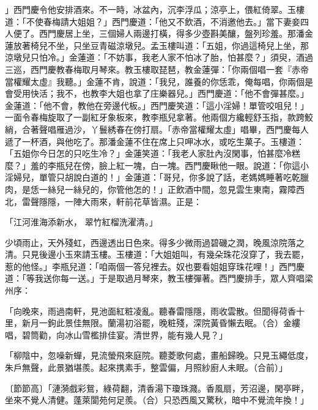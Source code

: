 \begin{showcontents}{}
」西門慶令他安排酒來。不一時，冰盆內，沉李浮瓜；涼亭上，偎紅倚翠。玉樓道：「不使春梅請大姐姐？」西門慶道：「他又不飲酒，不消邀他去。」當下妻妾四人便了。西門慶居上坐，三個婦人兩邊打橫，得多少壺斟美釀，盤列珍羞。那潘金蓮放著椅兒不坐，只坐豆青磁涼墩兒。孟玉樓叫道：「五姐，你過這椅兒上坐，那涼墩兒只怕冷。」金蓮道：「不妨事，我老人家不怕冰了胎，怕甚麼？」須臾，酒過三巡，西門慶教春梅取月琴來。教玉樓取琵琶，教金蓮彈：「你兩個唱一套『赤帝當權耀太虛』我聽。」金蓮不肯，說道：「我兒，誰養的你恁乖，俺每唱，你兩個是會受用快活；我不，也教李大姐也拿了庄樂器兒。」西門慶道：「他不會彈甚麼。」金蓮道：「他不會，教他在旁邊代板。」西門慶笑道：「這小淫婦！單管咬咀兒！」一面令春梅旋取了一副紅牙象板來，教李瓶兒拿著。他兩個方纔輕舒玉指，款跨鮫綃，合著聲唱雁過沙，丫鬟綉春在傍打扇。「赤帝當權耀太虛」唱畢，西門慶每人遞了一杯酒，與他吃了。那潘金蓮不住在席上只呷冰水，或吃生菓子。玉樓道：「五姐你今日怎的只吃生冷？」金蓮笑道：「我老人家肚內沒閑事，怕甚麼冷糕麼？」羞的李瓶兒在傍，臉上紅一塊，白一塊。西門慶瞅他一眼。說道：「你這小淫婦兒，單管只胡說白道的！」金蓮道：「哥兒，你多說了話，老媽媽睡著吃乾臘肉，是恁一絲兒一絲兒的，你管他怎的！」正飲酒中間，忽見雲生東南，霧障西北，雷聲隱隱，一陣大雨來，軒前花草皆濕。正是：

「江河淮海添新水，  翠竹紅榴洗濯清。」

少頃雨止，天外殘虹，西邊透出日色來。得多少微雨過碧磯之潤，晚風涼院落之清。只見後邊小玉來請玉樓。玉樓道：「大姐姐叫，有幾朵珠花沒穿了，我去罷，惹的他怪。」李瓶兒道：「咱兩個一答兒裡去。奴也要看姐姐穿珠花哩！」西門慶道：「等我送你每一送。」于是取過月琴來，教玉樓彈著。西門慶排手，眾人齊唱梁州序：

「向晚來，雨過南軒，見池面紅粧凌亂。聽春雷隱隱，雨收雲散。但聞得荷香十里，新月一鉤此景佳無限。蘭湯初浴罷，晚粧殘，深院黃昏懶去眠。（合）金縷唱，碧筒勸，向冰山雪檻排佳宴。清世界，能有幾人見？」

「柳陰中，忽噪新蟬，見流螢飛來庭院。聽菱歌何處，畫船歸晚。只見玉繩低度，朱戶無聲，此景猶堪羨。起來携素手，整雲偏，月照紗廚人未眠。（合前）」

〔節節高〕「漣漪戲彩鴛，綠荷翻，清香湯下瓊珠濺。香風扇，芳沼邊，閑亭畔，坐來不覺人清健。蓬萊閬苑何足羨。（合）只恐西風又驚秋，暗中不覺流年換！」


\end{showcontents}
